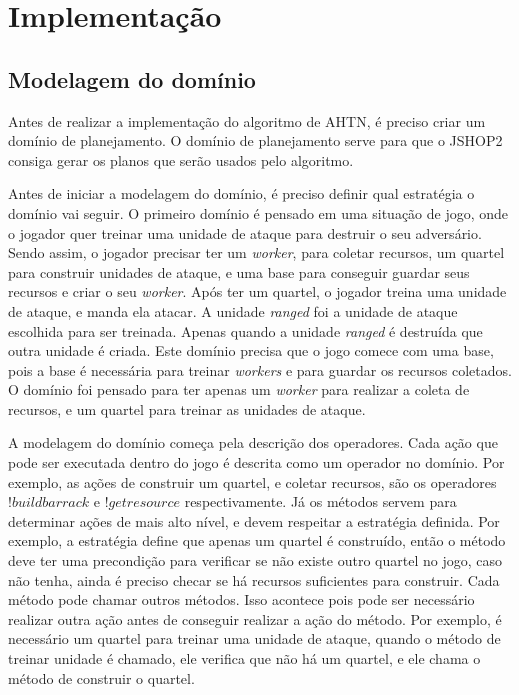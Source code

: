 
\chapter{\label{chap:impl}Implementação}

\section{Modelagem do domínio}

Antes de realizar a implementação do algoritmo de AHTN, é preciso criar um domínio de planejamento. 
O domínio de planejamento serve para que o JSHOP2 consiga gerar os planos que serão usados pelo algoritmo.

Antes de iniciar a modelagem do domínio, é preciso definir qual estratégia o domínio vai seguir.
O primeiro domínio é pensado em uma situação de jogo, onde o jogador quer treinar uma unidade de ataque para destruir o seu adversário.
Sendo assim, o jogador precisar ter um \textit{worker}, para coletar recursos, um quartel para construir unidades de ataque, e uma base para conseguir guardar seus recursos e criar o seu \textit{worker}. 
Após ter um quartel, o jogador treina uma unidade de ataque, e manda ela atacar.
A unidade \textit{ranged} foi a unidade de ataque escolhida para ser treinada.
Apenas quando a unidade \textit{ranged} é destruída que outra unidade é criada.
Este domínio precisa que o jogo comece com uma base, pois a base é necessária para treinar \textit{workers} e para guardar os recursos coletados.  
O domínio foi pensado para ter apenas um \textit{worker} para realizar a coleta de recursos, e um quartel para treinar as unidades de ataque.

A modelagem do domínio começa pela descrição dos operadores.
Cada ação que pode ser executada dentro do jogo é descrita como um operador no domínio.
Por exemplo, as ações de construir um quartel, e coletar recursos, são os operadores $!buildbarrack$ e $!getresource$ respectivamente.
Já os métodos servem para determinar ações de mais alto nível, e devem respeitar a estratégia definida.
Por exemplo, a estratégia define que apenas um quartel é construído, então o método deve ter uma precondição para verificar se não existe outro quartel no jogo, caso não tenha, ainda é preciso checar se há recursos suficientes para construir. 
Cada método pode chamar outros métodos.
Isso acontece pois pode ser necessário realizar outra ação antes de conseguir realizar a ação do método.
Por exemplo, é necessário um quartel para treinar uma unidade de ataque, quando o método de treinar unidade é chamado, ele verifica que não há um quartel, e ele chama o método de construir o quartel.

